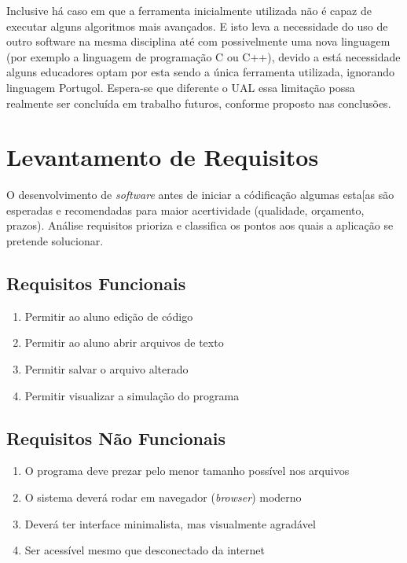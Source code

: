 Inclusive há caso em que a ferramenta inicialmente utilizada não é capaz de executar alguns algoritmos mais avançados. E isto leva a necessidade do uso de outro software na mesma disciplina até com possivelmente uma nova linguagem (por exemplo a linguagem de programação C ou C++), devido a está necessidade alguns educadores optam por esta sendo a única ferramenta utilizada, ignorando linguagem Portugol. Espera-se que diferente o UAL essa limitação possa realmente ser concluída em trabalho futuros, conforme proposto nas conclusões.

\section{Levantamento de Requisitos}


O desenvolvimento de \textit{software} antes de iniciar a códificação algumas esta[as são esperadas e recomendadas para maior acertividade (qualidade, orçamento, prazos). Análise requisitos prioriza e classifica os pontos aos quais a aplicação se pretende solucionar.

\subsection{Requisitos Funcionais}

\begin{enumerate}

\item Permitir ao aluno edição de código

\item Permitir ao aluno abrir arquivos de texto

\item Permitir salvar o arquivo alterado

\item Permitir visualizar a simulação do programa

\end{enumerate}

\subsection{Requisitos Não Funcionais}

\begin{enumerate}

\item O programa deve prezar pelo menor tamanho possível nos arquivos

\item O sistema deverá rodar em navegador (\textit{browser}) moderno

\item Deverá ter interface minimalista, mas visualmente agradável

\item Ser acessível mesmo que desconectado da internet

\end{enumerate}

